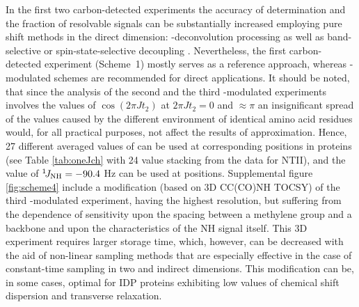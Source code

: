 \documentclass[twocolumn]{svjour3}           %
\begin{document}
In the first two carbon-detected experiments the accuracy of \gtwoCH{} determination and the fraction of resolvable signals can be substantially increased employing pure shift methods in the direct \clab{} dimension: \oneJcc-decon\-volution processing \cite{shimba_elimination_2003,kazimierczuk_non-uniform_2015} as well as band-selective or spin-state-selective decoupling \cite{zangger_pure_2015}. Nevertheless, the first carbon-detected experiment (Scheme~1) mostly serves as a reference approach, whereas \oneJch-modulated schemes are recommended for direct applications. It should be noted, that since the analysis of the second and the third \oneJch-modulated 
experiments involves the values of $\cos(2\pi J t_2)$  at 
$2\pi J t_2 = 0$ and $\approx \pi$ an insignificant 
spread of the \oneJch{} values caused by the different environment of 
identical amino acid residues would, for all practical purposes, not 
affect the results of approximation. Hence, 27 different averaged 
values of \oneJch{} can be used at corresponding \CHtwo{} positions in 
proteins (see Table \ref{tab:oneJch} with 24 \oneJch{} value stacking 
from the data for 
{NTII}), and the value of $^1\!J_\text{NH}{} = -90.4$ Hz can be used at \NHtwo{} 
positions. Supplemental figure \ref{fig:scheme4} include a modification 
(based on 3D {CC(CO)NH} 
{TOCSY}) of the third \oneJch-modulated experiment, having the highest 
resolution, but suffering from the dependence of sensitivity upon the 
spacing between a methylene group and a backbone and upon the 
characteristics of the {NH} signal itself. This 3D experiment requires 
larger storage time, which, however, can be decreased with the aid of 
non-linear sampling methods \cite{kazimierczuk_non-uniform_2015}
that are especially effective in the case of constant-time sampling in 
two \clab{} and \nlab{} indirect dimensions. This modification can be, 
in some cases, optimal for IDP proteins exhibiting low values of 
chemical shift dispersion and transverse relaxation. 
\end{document}
